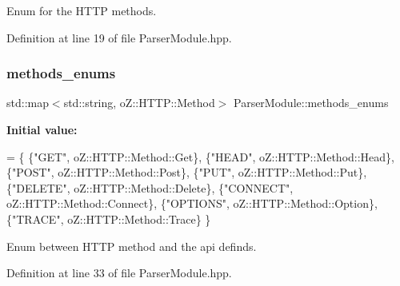 Enum for the H\+T\+TP methods. 



Definition at line 19 of file Parser\+Module.\+hpp.

\mbox{\label{namespace_parser_module_a4a564d139a12507911cf117e50ca1633}} 
\subsubsection{\texorpdfstring{methods\+\_\+enums}{methods\_enums}}
{\footnotesize\ttfamily std\+::map$<$std\+::string, o\+Z\+::\+H\+T\+T\+P\+::\+Method$>$ Parser\+Module\+::methods\+\_\+enums}

{\bfseries Initial value\+:}
\begin{DoxyCode}
= \{
        \{\textcolor{stringliteral}{"GET"},     oZ::HTTP::Method::Get\},
        \{\textcolor{stringliteral}{"HEAD"},    oZ::HTTP::Method::Head\},
        \{\textcolor{stringliteral}{"POST"},    oZ::HTTP::Method::Post\},
        \{\textcolor{stringliteral}{"PUT"},     oZ::HTTP::Method::Put\},
        \{\textcolor{stringliteral}{"DELETE"},  oZ::HTTP::Method::Delete\},
        \{\textcolor{stringliteral}{"CONNECT"}, oZ::HTTP::Method::Connect\},
        \{\textcolor{stringliteral}{"OPTIONS"}, oZ::HTTP::Method::Option\},
        \{\textcolor{stringliteral}{"TRACE"},   oZ::HTTP::Method::Trace\}
    \}
\end{DoxyCode}


Enum between H\+T\+TP method and the api definds. 



Definition at line 33 of file Parser\+Module.\+hpp.

